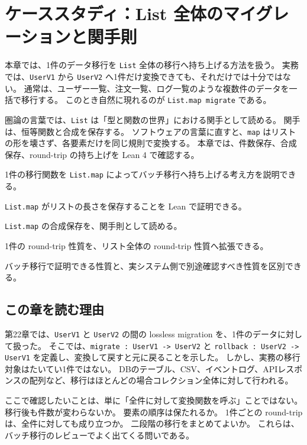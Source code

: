 \chapter{ケーススタディ：List 全体のマイグレーションと関手則}
\label{chap:ch24-list-migration-functor-laws}

\begin{chapterabstract}
本章では、1件のデータ移行を \texttt{List} 全体の移行へ持ち上げる方法を扱う。
実務では、\texttt{UserV1} から \texttt{UserV2} へ1件だけ変換できても、それだけでは十分ではない。
通常は、ユーザー一覧、注文一覧、ログ一覧のような複数件のデータを一括で移行する。
このとき自然に現れるのが \texttt{List.map migrate} である。

圏論の言葉では、\texttt{List} は「型と関数の世界」における関手として読める。
関手は、恒等関数と合成を保存する。
ソフトウェアの言葉に直すと、\texttt{map} はリストの形を壊さず、各要素だけを同じ規則で変換する。
本章では、件数保存、合成保存、round-trip の持ち上げを Lean 4 で確認する。
\end{chapterabstract}

\begin{learninggoals}
\item 1件の移行関数を \texttt{List.map} によってバッチ移行へ持ち上げる考え方を説明できる。
\item \texttt{List.map} がリストの長さを保存することを Lean で証明できる。
\item \texttt{List.map} の合成保存を、関手則として読める。
\item 1件の round-trip 性質を、リスト全体の round-trip 性質へ拡張できる。
\item バッチ移行で証明できる性質と、実システム側で別途確認すべき性質を区別できる。
\end{learninggoals}

\section{この章を読む理由}

第22章では、\texttt{UserV1} と \texttt{UserV2} の間の lossless migration を、1件のデータに対して扱った。
そこでは、\texttt{migrate : UserV1 -> UserV2} と \texttt{rollback : UserV2 -> UserV1} を定義し、変換して戻すと元に戻ることを示した。
しかし、実務の移行対象はたいてい1件ではない。
DBのテーブル、CSV、イベントログ、APIレスポンスの配列など、移行はほとんどの場合コレクション全体に対して行われる。

ここで確認したいことは、単に「全件に対して変換関数を呼ぶ」ことではない。
移行後も件数が変わらないか。
要素の順序は保たれるか。
1件ごとの round-trip は、全件に対しても成り立つか。
二段階の移行をまとめてよいか。
これらは、バッチ移行のレビューでよく出てくる問いである。

